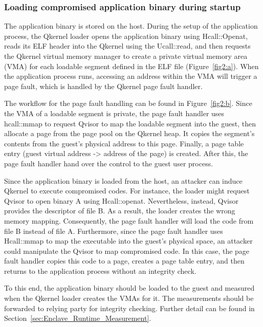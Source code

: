 \subsubsection{Loading compromised application binary during startup}
\label{sec:app_binary_loading}
The application binary is stored on the host. During the setup of the application process, the Qkernel loader opens the application binary using Hcall::Openat, reads its ELF header into the Qkernel using the Ucall::read, and then requests the Qkernel virtual memory manager to create a private virtual 
memory area (VMA) for each loadable segment defined in the ELF file (Figure~\ref{fig2:a}). When the application process runs, accessing an address within the VMA will trigger a page fault, which is handled by the Qkernel page fault handler.
 
The workflow for the page fault handling can be found in Figure~\ref{fig2:b}. Since the VMA of a loadable segment is private, the page fault handler uses hcall::mmap to request Qvisor to map the loadable segment into the guest, then allocate a page from the page pool on the Qkernel heap. It copies the 
segment's contents from the guest's physical address to this page. Finally, a page table entry (guest virtual address -> address of the page) is created. After this, the page fault handler hand over the control to the guest user process.
 
Since the application binary is loaded from the host,  an attacker can induce Qkernel to execute compromised codes. For instance, the loader might request Qvisor to open binary A using Hcall::openat. Nevertheless, instead, Qvisor provides the descriptor of file B. As a result, the loader creates the 
wrong memory mapping. Consequently, the page fault handler will load the code from file B instead of file A. Furthermore, since the page fault handler uses Hcall::mmap to map the executable into the guest's physical space, an attacker could manipulate the Qvisor to map compromised code. In this case, 
the page fault handler copies this code to a page, creates a page table entry, and then returns to the application process without an integrity check.  
 
To this end, the application binary should be loaded to the guest and measured when the Qkernel loader creates the VMAs for it. The measurements should be forwarded to relying party for integrity checking. Further detail can be found in Section~\ref{sec:Enclave_Runtime_Measurement}. 

